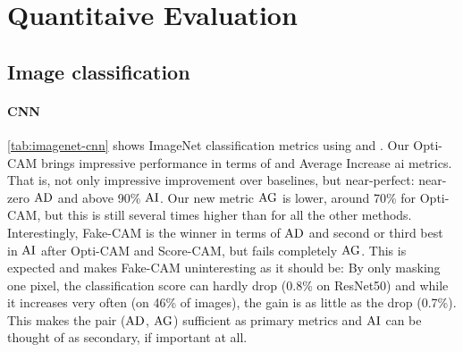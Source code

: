 \section{Quantitaive Evaluation}
\label{sec:oc_quant}

\subsection{Image classification}

\paragraph{CNN}
\autoref{tab:imagenet-cnn} shows ImageNet classification metrics using  and .
 Our Opti-CAM brings impressive performance in terms of  and Average Increase 
 \gls{ai} metrics. That is, not only impressive improvement over baselines, but near-perfect: 
 near-zero $\operatorname{AD}$ and above 90\% $\operatorname{AI}$. Our new metric $\operatorname{AG}$ is lower, around 70\% 
 for Opti-CAM, but this is still several times higher than for all the other methods.\\

\noindent Interestingly, Fake-CAM \autocite{poppi2021revisiting} is the winner in terms of $\operatorname{AD}$ 
and second or third best in $\operatorname{AI}$ after Opti-CAM and Score-CAM, but fails completely $\operatorname{AG}$. This is 
expected and makes Fake-CAM uninteresting as it should be: By only masking one pixel, the 
classification score can hardly drop (0.8\% on ResNet50) and while it increases very often (on 
46\% of images), the gain is as little as the drop (0.7\%). This makes the pair ($\operatorname{AD}$, $\operatorname{AG}$) 
sufficient as primary metrics and $\operatorname{AI}$ can be thought of as secondary, if important at all.\\



